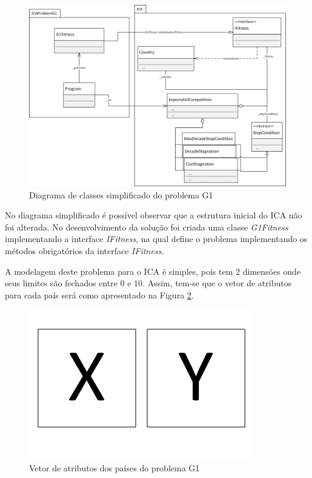 \begin{figure}[h]
	\centering
	\includegraphics[scale=0.6]{Figuras/Problems-G1Model.png}
	\caption{Diagrama de classes simplificado do problema G1}
	\label{fig:Problems-G1Model}
\end{figure}

No diagrama simplificado é possível observar que a estrutura inicial do ICA não foi alterada. No desenvolvimento da solução foi criada uma classe \emph{G1Fitness} implementando a interface \emph{IFitness}, na qual define o problema implementando os métodos obrigatórios da interface \emph{IFitness}.

A modelagem deste problema para o ICA é simples, pois tem 2 dimensões onde seus limites são fechados entre 0 e 10. Assim, tem-se que o vetor de atributos para cada país será como apresentado na Figura \ref{fig:Problems-G1Vector}.

\begin{figure}[h]
	\centering
	\includegraphics[scale=0.6]{Figuras/Problems-G1Vector.png}
	\caption{Vetor de atributos dos países do problema G1}
	\label{fig:Problems-G1Vector}
\end{figure}

